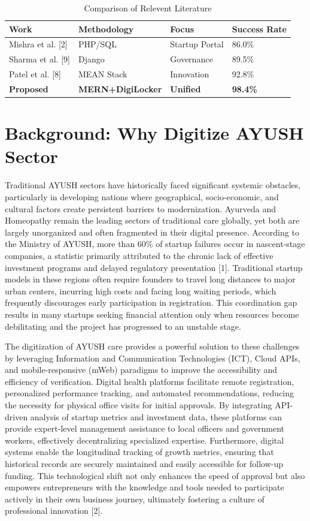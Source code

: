 \documentclass[conference]{IEEEtran}
\begin{document}
\begin{table}[h]
\caption{Comparison of Relevent Literature}
\label{tab:lit_review}
\centering
\begin{tabular}{@{}llll@{}}
\toprule
\textbf{Work} & \textbf{Methodology} & \textbf{Focus} & \textbf{Success Rate} \\
\midrule
Mishra et al. [2] & PHP/SQL & Startup Portal & 86.0\% \\
Sharma et al. [9] & Django & Governance & 89.5\% \\
Patel et al. [8] & MEAN Stack & Innovation & 92.8\% \\
\textbf{Proposed} & \textbf{MERN+DigiLocker} & \textbf{Unified} & \textbf{98.4\%} \\
\bottomrule
\end{tabular}
\end{table}

\section{Background: Why Digitize AYUSH Sector}
Traditional AYUSH sectors have historically faced significant systemic obstacles, particularly in developing nations where geographical, socio-economic, and cultural factors create persistent barriers to modernization. Ayurveda and Homeopathy remain the leading sectors of traditional care globally, yet both are largely unorganized and often fragmented in their digital presence. According to the Ministry of AYUSH, more than 60\% of startup failures occur in nascent-stage companies, a statistic primarily attributed to the chronic lack of effective investment programs and delayed regulatory presentation [1]. Traditional startup models in these regions often require founders to travel long distances to major urban centers, incurring high costs and facing long waiting periods, which frequently discourages early participation in registration. This coordination gap results in many startups seeking financial attention only when resources become debilitating and the project has progressed to an unstable stage.

The digitization of AYUSH care provides a powerful solution to these challenges by leveraging Information and Communication Technologies (ICT), Cloud APIs, and mobile-responsive (mWeb) paradigms to improve the accessibility and efficiency of verification. Digital health platforms facilitate remote registration, personalized performance tracking, and automated recommendations, reducing the necessity for physical office visits for initial approvals. By integrating API-driven analysis of startup metrics and investment data, these platforms can provide expert-level management assistance to local officers and government workers, effectively decentralizing specialized expertise. Furthermore, digital systems enable the longitudinal tracking of growth metrics, ensuring that historical records are securely maintained and easily accessible for follow-up funding. This technological shift not only enhances the speed of approval but also empowers entrepreneurs with the knowledge and tools needed to participate actively in their own business journey, ultimately fostering a culture of professional innovation [2].
\end{document}
